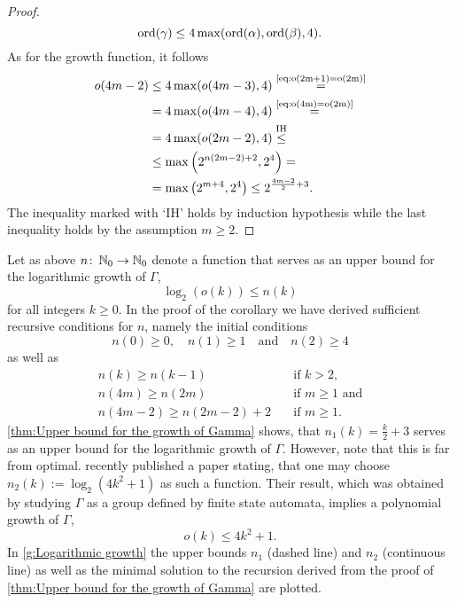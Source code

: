 \begin{proof}
\begin{equation*}
\operatorname{\mathrm{ord}}(\gamma)\leq4\max(\operatorname{\mathrm{ord}}(\alpha), \operatorname{\mathrm{ord}}(\beta), 4).
\end{equation*}
As for the growth function, it follows
\begin{align*}
o(4m-2)	&\leq 4\max(o(4m-3),4)\overset{\text{\cref{eq:o(2m+1)=o(2m)}}}{=}\\
		&= 4\max(o(4m-4),4)\overset{\text{\cref{eq:o(4m)=o(2m)}}}{=}\\
		&=4\max(o(2m-2),4)\overset{\text{IH}}{\leq}\\
		&\leq \max\left(2^{n(2m-2)+2}, 2^4\right)=\\
		&=\max\left(2^{m+4},2^4\right)\leq 2^{\frac{4m-2}{2}+3}.
\end{align*}
The inequality marked with `IH' holds by induction hypothesis while the last inequality holds by the assumption $m\geq 2$.
\end{proof}

Let as above $n\colon\operatorname{\mathbb{N}}_0\to\operatorname{\mathbb{N}}_0$ denote a function that serves as an upper bound for the logarithmic growth of $\Gamma$, \ie
\begin{equation*}
\log_2(o(k))\leq n(k)
\end{equation*}
for all integers $k\geq 0$. In the proof of the corollary we have derived sufficient recursive conditions for $n$, namely the initial conditions
\begin{equation*}
n(0)\geq 0,\quad n(1)\geq 1\quad \text{and}\quad n(2)\geq 4
\end{equation*}
as well as
\begin{align*}
n(k)\geq n(k-1)&\quad\text{if } k>2,\\
n(4m)\geq n(2m)&\quad\text{if } m\geq 1\text{ and}\\
n(4m-2)\geq n(2m-2)+2&\quad\text{if } m\geq 1.
\end{align*}
\cref{thm:Upper bound for the growth of Gamma} shows, that $n_1(k)=\frac{k}{2}+3$ serves as an upper bound for the logarithmic growth of $\Gamma$. However, note that this is far from optimal. \textcite{2006math} recently published a paper stating, that one may choose $n_2(k):=\log_2(4k^2+1)$ as such a function. Their result, which was obtained by studying $\Gamma$ as a group defined by finite state automata, implies a polynomial growth of $\Gamma$, \ie
\begin{equation*}
o(k)\leq 4k^2+1.
\end{equation*}
In \cref{g:Logarithmic growth} the upper bounds $n_1$ (dashed line) and $n_2$ (continuous line) as well as the minimal solution to the recursion derived from the proof of \cref{thm:Upper bound for the growth of Gamma} are plotted. 


